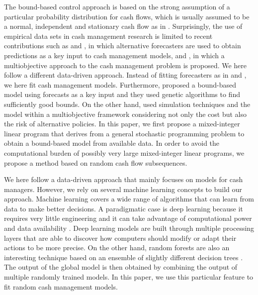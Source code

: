The bound-based control approach is based on the strong assumption of a particular probability distribution for cash flows, which is usually assumed to be a normal, independent and stationary cash flow as in \cite{miller1966model,baccarin2009optimal,premachandra2004diffusion}. Surprisingly, the use of empirical data sets in cash management research is limited to recent contributions such as \cite{gormley2007utility} and \cite{salas2017empowering}, in which alternative forecasters are used to obtain predictions as a key input to cash management models, and \cite{salas2016multi}, in which a multiobjective approach to the cash management problem is proposed. We here follow a different data-driven approach. Instead of fitting forecasters as in \cite{gormley2007utility} and \cite{salas2017empowering}, we here fit cash management models. Furthermore, \cite{gormley2007utility} proposed a bound-based model using forecasts as a key input and they used genetic algorithms to find sufficiently good bounds. On the other hand, \cite{salas2016multi} used simulation techniques and the \cite{miller1966model} model within a multiobjective framework considering not only the cost but also the risk of alternative policies. In this paper, we first propose a mixed-integer linear program that derives from a general stochastic programming problem to obtain a bound-based model from available data. In order to avoid the computational burden of possibly very large mixed-integer linear programs, we propose a method based on random cash flow subsequences.


We here follow a data-driven approach that mainly focuses on models for cash managers. However, we rely on several machine learning concepts to build our approach. Machine learning covers a wide range of algorithms that can learn from data to make better decisions. A paradigmatic case is deep learning because it requires very little engineering and it can take advantage of computational power and data availability \citep{lecun2015deep,schmidhuber2015deep}. Deep learning models are built through multiple processing layers that are able to discover how computers should modify or adapt their actions to be more precise. On the other hand, random forests are also an interesting technique based on an ensemble of slightly different decision trees \citep{ho1998random,breiman2001random}. The output of the global model is then obtained by combining the output of multiple randomly trained models. In this paper, we use this particular feature to fit random cash management models.



